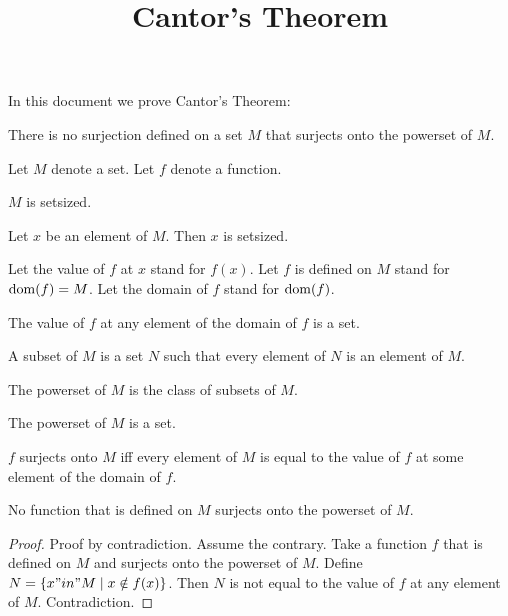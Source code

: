 \documentclass{article}
\title{Cantor's Theorem}
\author{}
\date{}
\begin{document}

  \maketitle

  In this document we prove Cantor's Theorem:

  \begin{quotedtheorem}
    There is no surjection defined on a set $M$ that surjects onto the powerset of $M$.
  \end{quotedtheorem}

  \begin{forthel}

    Let $M$ denote a set. Let $f$ denote a function.

    \begin{axiom}
        $M$ is setsized.
    \end{axiom}

    \begin{axiom}
        Let $x$ be an element of $M$. Then $x$ is setsized.
    \end{axiom}

    Let the value of $f$ at $x$ stand for $f(x)$.
    Let $f$ is defined on $M$ stand for $\operatorname{dom}(f) = M$.
    Let the domain of $f$ stand for $\operatorname{dom}(f)$.


    \begin{axiom}
      The value of $f$ at any element of the domain of $f$ is a set.
    \end{axiom}

    \begin{definition}[Subset]
      A subset of $M$ is a set $N$ such that every element of $N$ is an element of $M$.
    \end{definition}

    \begin{definition}
      The powerset of $M$ is the class of subsets of $M$.
    \end{definition}

    \begin{axiom}
      The powerset of $M$ is a set.
    \end{axiom}

    \begin{definition}
      $f$ surjects onto $M$ iff every element of $M$ is equal to the value of $f$ at some element of the domain of $f$.
    \end{definition}

    \begin{theorem}[Cantor]
      No function that is defined on $M$ surjects onto the powerset of $M$.
    \end{theorem}
    \begin{proof}
      Proof by contradiction. Assume the contrary.
      Take a function $f$ that is defined on $M$ and surjects onto the powerset of $M$.
      Define $N = \{ x "in" M \mid x \notin f(x) \}$.
      Then $N$ is not equal to the value of $f$ at any element of $M$.
      Contradiction.
    \end{proof}

  \end{forthel}
\end{document}
